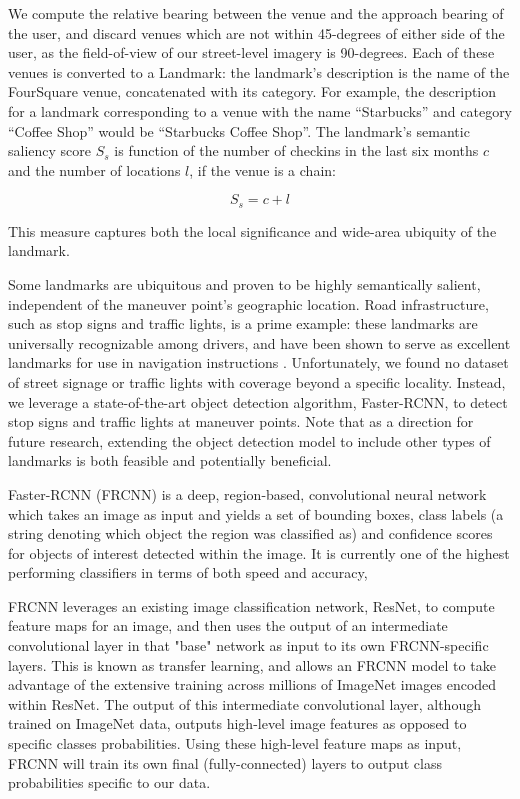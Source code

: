 We compute the relative bearing between the venue and the approach bearing of the user, and discard venues which are not within 45-degrees of either side of the user, as the field-of-view of our street-level imagery is 90-degrees.
Each of these venues is converted to a Landmark: the landmark's description is the name of the FourSquare venue, concatenated with its category. For example, the description for a landmark corresponding to a venue with the name “Starbucks” and category “Coffee Shop” would be “Starbucks Coffee Shop”. The landmark’s semantic saliency score $S_s$ is function of the number of checkins in the last six months $c$ and the number of locations $l$, if the venue is a chain:

\begin{equation}
    S_s = c + l
\end{equation}

This measure captures both the local significance and wide-area ubiquity of the landmark.

Some landmarks are ubiquitous and proven to be highly semantically salient, independent of the maneuver point's geographic location. Road infrastructure, such as stop signs and traffic lights, is a prime example: these landmarks are universally recognizable among drivers, and have been shown to serve as excellent landmarks for use in navigation instructions \cite{may_ross_bayer_2005}. Unfortunately, we found no dataset of street signage or traffic lights with coverage beyond a specific locality. Instead, we leverage a state-of-the-art object detection algorithm, Faster-RCNN, to detect stop signs and traffic lights at maneuver points. Note that as a direction for future research, extending the object detection model to include other types of landmarks is both feasible and potentially beneficial.

Faster-RCNN (FRCNN) \cite{ren2015faster} is a deep, region-based, convolutional neural network which takes an image as input and yields a set of bounding boxes, class labels (a string denoting which object the region was classified as) and confidence scores for objects of interest detected within the image. It is currently one of the highest performing classifiers in terms of both speed and accuracy, 

FRCNN leverages an existing image classification network, ResNet, to compute feature maps for an image, and then uses the output of an intermediate convolutional layer in that "base" network as input to its own FRCNN-specific layers. This is known as transfer learning, and allows an FRCNN model to take advantage of the extensive training across millions of ImageNet images encoded within ResNet. The output of this intermediate convolutional layer, although trained on ImageNet data, outputs high-level image features as opposed to specific classes probabilities. Using these high-level feature maps as input, FRCNN will train its own final (fully-connected) layers to output class probabilities specific to our data.

